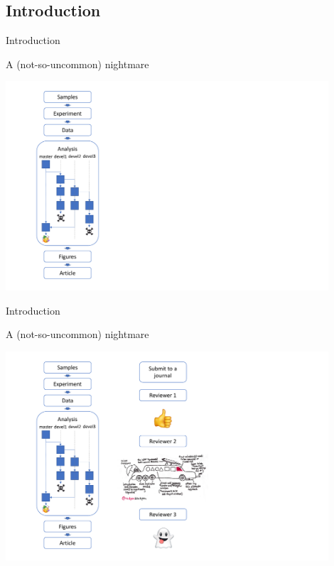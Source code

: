 \subsection{Introduction}

\begin{frame}{Introduction}

\begin{center}
A (not-so-uncommon) nightmare

\includegraphics[width=12cm]{02_encapsulation/figures/nightmare_v2-1.pdf}

\end{center}

\end{frame}

\begin{frame}{Introduction}

\begin{center}
A (not-so-uncommon) nightmare

\includegraphics[width=12cm]{02_encapsulation/figures/nightmare_v2-2.pdf}

\end{center}

\end{frame}

